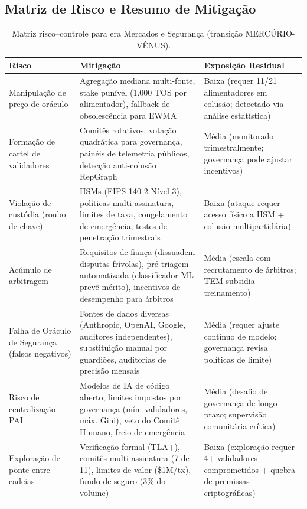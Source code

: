 \documentclass[11pt]{article}
\begin{document}
\subsection{Matriz de Risco e Resumo de Mitigação}
\begin{longtable}{@{}p{}p{}p{}@{}}
\toprule
\textbf{Risco} & \textbf{Mitigação} & \textbf{Exposição Residual} \\\midrule
Manipulação de preço de oráculo & Agregação mediana multi-fonte, stake punível (1.000 TOS por alimentador), fallback de obsolescência para EWMA & Baixa (requer 11/21 alimentadores em colusão; detectado via análise estatística) \\
Formação de cartel de validadores & Comitês rotativos, votação quadrática para governança, painéis de telemetria públicos, detecção anti-colusão RepGraph & Média (monitorado trimestralmente; governança pode ajustar incentivos) \\
Violação de custódia (roubo de chave) & HSMs (FIPS 140-2 Nível 3), políticas multi-assinatura, limites de taxa, congelamento de emergência, testes de penetração trimestrais & Baixa (ataque requer acesso físico a HSM + colusão multipartidária) \\
Acúmulo de arbitragem & Requisitos de fiança (dissuadem disputas frívolas), pré-triagem automatizada (classificador ML prevê mérito), incentivos de desempenho para árbitros & Média (escala com recrutamento de árbitros; TEM subsidia treinamento) \\
Falha de Oráculo de Segurança (falsos negativos) & Fontes de dados diversas (Anthropic, OpenAI, Google, auditores independentes), substituição manual por guardiões, auditorias de precisão mensais & Média (requer ajuste contínuo de modelo; governança revisa políticas de limite) \\
Risco de centralização PAI & Modelos de IA de código aberto, limites impostos por governança (mín. validadores, máx. Gini), veto do Comitê Humano, freio de emergência & Média (desafio de governança de longo prazo; supervisão comunitária crítica) \\
Exploração de ponte entre cadeias & Verificação formal (TLA+), comitês multi-assinatura (7-de-11), limites de valor (\$1M/tx), fundo de seguro (3\% do volume) & Baixa (exploração requer 4+ validadores comprometidos + quebra de premissas criptográficas) \\\bottomrule
\caption{Matriz risco--controle para era Mercados e Segurança (transição MERCÚRIO-VÊNUS).}
\label{tab:risk-markets-expanded}
\end{longtable}
\end{document}
